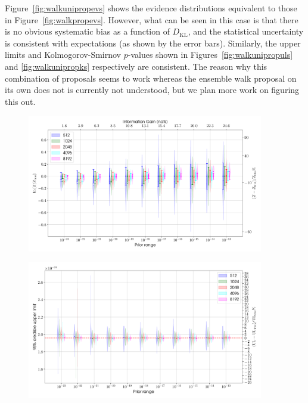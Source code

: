 Figure~\ref{fig:walkunipropevs} shows the evidence distributions equivalent to those in Figure~\ref{fig:walkpropevs}. However, what can
be seen in this case is that there is no obvious systematic bias as a function of $D_{\text{KL}}$, and the statistical uncertainty is
consistent with expectations (as shown by the error bars). Similarly, the upper limits and Kolmogorov-Smirnov $p$-values shown in
Figures~\ref{fig:walkunipropuls} and \ref{fig:walkunipropks} respectively are consistent. The reason why this combination of proposals
seems to work whereas the ensemble walk proposal on its own does not is currently not understood, but we plan more work on figuring this
out.

\begin{figure}[phtb]
\begin{center}
\includegraphics[width=0.92\textwidth]{./figures/proptesting/walk_uniform_prop/evidences/collate_plots_wup_evidences}
\caption{ \protect}
\end{center}
\end{figure}

\begin{figure}[phtb]
\begin{center}
\includegraphics[width=0.92\textwidth]{./figures/proptesting/walk_uniform_prop/upperlimits/collate_plots_wup_uls}
\caption{ \protect}
\end{center}
\end{figure}

